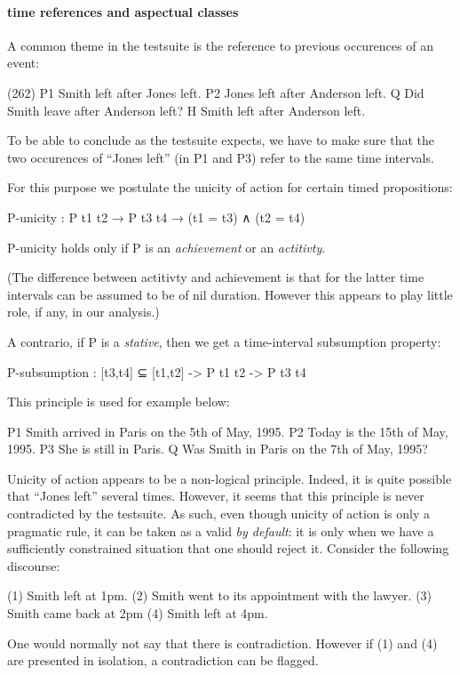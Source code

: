 \documentclass[a4paper,11pt]{article}
\begin{document}
\paragraph{time references and aspectual classes}

A common theme in the testsuite is the reference to previous
occurences of an event:

(262)
P1	Smith left after Jones left.
P2	Jones left after Anderson left.
Q 	Did Smith leave after Anderson left?
H 	Smith left after Anderson left.

To be able to conclude as the testsuite expects, we have to make sure
that the two occurences of ``Jones left'' (in P1 and P3) refer to the
same time intervals.

For this purpose we postulate the unicity of action for certain timed
propositions:

P-unicity : P t1 t2 → P t3 t4 → (t1 = t3) ∧ (t2 = t4)

P-unicity holds only if P is an \emph{achievement} or an \emph{actitivty}.

(The difference between actitivty and achievement is that for the
latter time intervals can be assumed to be of nil duration. However
this appears to play little role, if any, in our analysis.)

A contrario, if P is a \emph{stative}, then we get a time-interval subsumption property:

P-subsumption : [t3,t4] ⊆ [t1,t2] -> P t1 t2 -> P t3 t4

This principle is used for example below:

P1	Smith arrived in Paris on the 5th of May, 1995.
P2	Today is the 15th of May, 1995.
P3	She is still in Paris.
Q 	Was Smith in Paris on the 7th of May, 1995? 

Unicity of action appears to be a non-logical principle. Indeed, it is
quite possible that ``Jones left'' several times. However, it seems
that this principle is never contradicted by the testsuite. As such,
even though unicity of action is only a pragmatic rule, it can be
taken as a valid \emph{by default}: it is only when we have a
sufficiently constrained situation that one should reject it. Consider
the following discourse:

(1) Smith left at 1pm.
(2) Smith went to its appointment with the lawyer.
(3) Smith came back at 2pm
(4) Smith left at 4pm.

One would normally not say that there is contradiction. However if (1)
and (4) are presented in isolation, a contradiction can be flagged.
\end{document}
